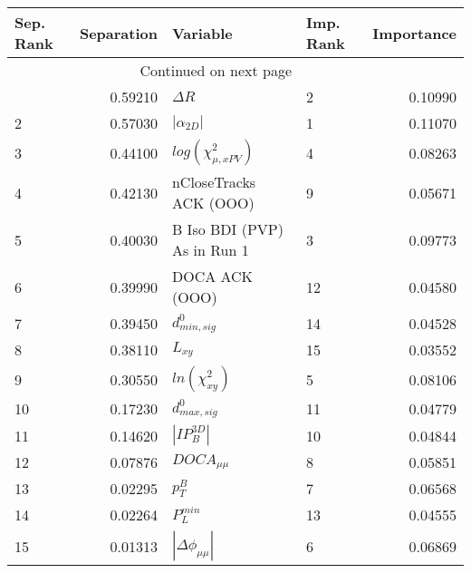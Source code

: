 \usepackage{lscape}

\begin{landscape}
\begin{longtable}{lrllr}
\toprule
Sep. Rank &  Separation &                     Variable & Imp. Rank &  Importance \\
\midrule
\endhead
\midrule
\multicolumn{3}{r}{{Continued on next page}} \\
\midrule
\endfoot

\bottomrule
\endlastfoot
        1 &     0.59210 &                   $\Delta R$ &         2 &     0.10990 \\
        2 &     0.57030 &              $|\alpha_{2D}|$ &         1 &     0.11070 \\
        3 &     0.44100 &    $log(\chi^{2}_{\mu,xPV})$ &         4 &     0.08263 \\
        4 &     0.42130 &       nCloseTracks ACK (OOO) &         9 &     0.05671 \\
        5 &     0.40030 &  B Iso BDI (PVP) As in Run 1 &         3 &     0.09773 \\
        6 &     0.39990 &               DOCA ACK (OOO) &        12 &     0.04580 \\
        7 &     0.39450 &             $d^0_{min, sig}$ &        14 &     0.04528 \\
        8 &     0.38110 &                     $L_{xy}$ &        15 &     0.03552 \\
        9 &     0.30550 &          $ln(\chi^{2}_{xy})$ &         5 &     0.08106 \\
       10 &     0.17230 &             $d^0_{max, sig}$ &        11 &     0.04779 \\
       11 &     0.14620 &              $|IP_{B}^{3D}|$ &        10 &     0.04844 \\
       12 &     0.07876 &              $DOCA_{\mu\mu}$ &         8 &     0.05851 \\
       13 &     0.02295 &                    $p^B_{T}$ &         7 &     0.06568 \\
       14 &     0.02264 &                $P^{min}_{L}$ &        13 &     0.04555 \\
       15 &     0.01313 &     $|\Delta \phi_{\mu\mu}|$ &         6 &     0.06869 \\
\end{longtable}

\end{landscape}
